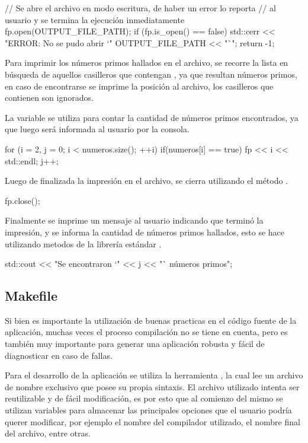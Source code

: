 \documentclass[12pt]{article}
\newenvironment{fullgrayverb}
{\verbbox}
{\endverbbox\par\colorbox{gray!25}{\parbox{\textwidth}{\theverbbox}}\par}
\begin{document}
\begin{fullgrayverb}[\mbox{}]
// Se abre el archivo en modo escritura, de haber un error lo reporta
// al usuario y se termina la ejecución inmediatamente
fp.open(OUTPUT_FILE_PATH);
if (fp.is_open() == false) {
    std::cerr << "ERROR: No se pudo abrir `" OUTPUT_FILE_PATH << "`\n";
    return -1;
}
\end{fullgrayverb}

Para imprimir los números primos hallados en el archivo, se recorre la lista en
búsqueda de aquellos casilleros que contengan , ya que resultan
números primos, en caso de encontrarse se imprime la posición al archivo, los
casilleros que contienen  son ignorados. 

La variable  se utiliza para contar la cantidad de números primos
encontrados, ya que luego será informada al usuario por la consola.

\begin{fullgrayverb}[\mbox{}]
for (i = 2, j = 0; i < numeros.size(); ++i) {
    if(numeros[i] == true) {
        fp << i << std::endl;
        j++;
    }
}
\end{fullgrayverb}

Luego de finalizada la impresión en el archivo, se cierra utilizando el método
.

\begin{fullgrayverb}[\mbox{}]
fp.close();
\end{fullgrayverb}

\pagebreak
Finalmente se imprime un mensaje al usuario indicando que terminó la impresión,
y se informa la cantidad de números primos hallados, esto se hace utilizando
metodos de la librería estándar .

\begin{fullgrayverb}[\mbox{}]
std::cout << "Se encontraron `" << j << "` números primos\n";
\end{fullgrayverb}

\subsection{Makefile}

Si bien es importante la utilización de buenas practicas en el código fuente de
la aplicación, muchas veces el proceso compilación no se tiene en cuenta,
pero es también muy importante para generar una aplicación robusta y fácil de
diagnosticar en caso de fallas.

Para el desarrollo de la aplicación se utiliza la herramienta ,
la cual lee un archivo de nombre exclusivo  que posee su propia
sintaxis. El archivo  utilizado intenta ser reutilizable y de
fácil modificación, es por esto que al comienzo del mismo se utilizan variables
para almacenar las principales opciones que el usuario podría querer modificar,
por ejemplo el nombre del compilador utilizado, el nombre final del archivo,
entre otras.
\end{document}
